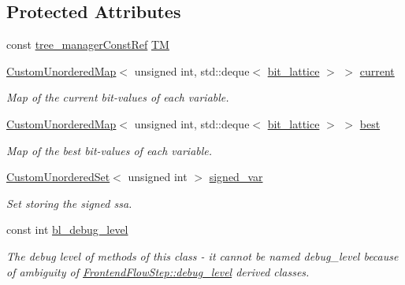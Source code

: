 \subsection*{Protected Attributes}
\begin{DoxyCompactItemize}
\item 
const \hyperlink{tree__manager_8hpp_a792e3f1f892d7d997a8d8a4a12e39346}{tree\+\_\+manager\+Const\+Ref} \hyperlink{classBitLatticeManipulator_a473b1053ef1f3426a9895c4d604f6aad}{TM}
\item 
\hyperlink{custom__map_8hpp_ad1ed68f2ff093683ab1a33522b144adc}{Custom\+Unordered\+Map}$<$ unsigned int, std\+::deque$<$ \hyperlink{bit__lattice_8hpp_ab732360111c810c4eaeb4c8b81d160d6}{bit\+\_\+lattice} $>$ $>$ \hyperlink{classBitLatticeManipulator_a5fd2618eb910bb8d68ad7eea945ec12a}{current}
\begin{DoxyCompactList}\small\item\em Map of the current bit-\/values of each variable. \end{DoxyCompactList}\item 
\hyperlink{custom__map_8hpp_ad1ed68f2ff093683ab1a33522b144adc}{Custom\+Unordered\+Map}$<$ unsigned int, std\+::deque$<$ \hyperlink{bit__lattice_8hpp_ab732360111c810c4eaeb4c8b81d160d6}{bit\+\_\+lattice} $>$ $>$ \hyperlink{classBitLatticeManipulator_a5f5c52d2777f40ca8c3c96f28eb5f53f}{best}
\begin{DoxyCompactList}\small\item\em Map of the best bit-\/values of each variable. \end{DoxyCompactList}\item 
\hyperlink{classCustomUnorderedSet}{Custom\+Unordered\+Set}$<$ unsigned int $>$ \hyperlink{classBitLatticeManipulator_a1e4f6088cdd2a8c6c8e1e3b1f72810ca}{signed\+\_\+var}
\begin{DoxyCompactList}\small\item\em Set storing the signed ssa. \end{DoxyCompactList}\item 
const int \hyperlink{classBitLatticeManipulator_ae8ecb9f512de73fdf87db86656443333}{bl\+\_\+debug\+\_\+level}
\begin{DoxyCompactList}\small\item\em The debug level of methods of this class -\/ it cannot be named debug\+\_\+level because of ambiguity of \hyperlink{classDesignFlowStep_a5cc9222e58f094a5b1b78cb4426ef8b4}{Frontend\+Flow\+Step\+::debug\+\_\+level} derived classes. \end{DoxyCompactList}\end{DoxyCompactItemize}


